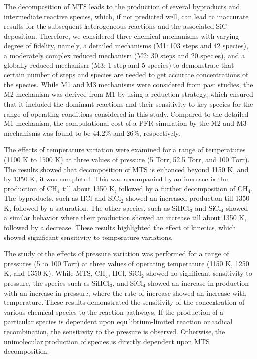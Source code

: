 \documentclass[final, letterpaper, square, comma, numbers, sort&compress]{elsarticle}
\begin{document}
The decomposition of MTS leads to the production of several byproducts and intermediate reactive species, which, if not predicted well, can lead to inaccurate results for the subsequent heterogeneous reactions and the associated SiC deposition. Therefore, we considered three chemical mechanisms with varying degree of fidelity, namely, a detailed mechanisms (M1: 103 steps and 42 species), a moderately complex reduced mechanism (M2: 30 steps and 20 species), and a globally reduced mechanism (M3: 1 step and 5 species) to demonstrate that certain number of steps and species are needed to get accurate concentrations of the species. While M1 and M3 mechanisms were considered from past studies, the M2 mechanism was derived from M1 by using a reduction strategy, which ensured that it included the dominant reactions and their sensitivity to key species for the range of operating conditions considered in this study. Compared to the detailed M1 mechanism, the computational cost of a PFR simulation by the M2 and M3 mechanisms was found to be 44.2\% and 26\%, respectively.

The effects of temperature variation were examined for a range of temperatures (1100 K to 1600 K) at three values of pressure (5 Torr, 52.5 Torr, and 100 Torr). The results showed that decomposition of MTS is enhanced beyond 1150 K, and by 1350 K, it was completed. This was accompanied by an increase in the production of CH$_4$ till about 1350 K, followed by a further decomposition of CH$_4$. The byproducts, such as HCl and SiCl$_2$ showed an increased production till 1350 K, followed by a saturation. The other species, such as SiHCl$_3$ and SiCl$_4$ showed a similar behavior where their production showed an increase till about 1350 K, followed by a decrease. These results highlighted the effect of kinetics, which showed significant sensitivity to temperature variations.

The study of the effects of pressure variation was performed for a range of pressures (5 to 100 Torr) at three values of operating temperature (1150 K, 1250 K, and 1350 K). While MTS, CH$_4$, HCl, SiCl$_2$ showed no significant sensitivity to pressure, the species such as SiHCl$_3$, and SiCl$_4$ showed an increase in production with an increase in pressure, where the rate of increase showed an increase with temperature. These results demonstrated the sensitivity of the concentration of various chemical species to the reaction pathways. If the production of a particular species is dependent upon equilibrium-limited reaction or radical recombination, the sensitivity to the pressure is observed. Otherwise, the unimolecular production of species is directly dependent upon MTS decomposition.
\end{document}
